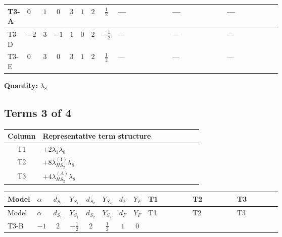 \documentclass[8pt]{article}
\begin{document}
\begin{landscape}
\begin{longtable}{@{}llcccccc >{\raggedright\arraybackslash}p{0.21\linewidth} >{\raggedright\arraybackslash}p{0.21\linewidth} >{\raggedright\arraybackslash}p{0.21\linewidth}@{}}
\midrule
T3-A & $0$ & $1$ & $0$ & $3$ & $1$ & $2$ & $\frac{1}{2}$ & --- & --- & --- \\
\midrule
T3-D & $-2$ & $3$ & $-1$ & $1$ & $0$ & $2$ & $-\frac{1}{2}$ & --- & --- & --- \\
\midrule
T3-E & $0$ & $3$ & $0$ & $3$ & $1$ & $2$ & $\frac{1}{2}$ & --- & --- & --- \\
\midrule
\bottomrule
\end{longtable}
\clearpage
\noindent\textbf{Quantity: }$\lambda_{8}$\par\smallskip
\subsection*{Terms 3 of 4}
\begin{center}
\begin{tabular}{@{}c >{\raggedright\arraybackslash}p{0.82\linewidth}@{}}
\toprule
Column & Representative term structure \\
\midrule
T1 & \(\displaystyle +2 {\lambda_1} {\lambda_8}\) \\
\midrule
T2 & \(\displaystyle +8 {\lambda_{HS_2}^{(1)}} {\lambda_8}\) \\
\midrule
T3 & \(\displaystyle +4 {\lambda_{HS_2}^{(A)}} {\lambda_8}\) \\
\midrule
\bottomrule
\end{tabular}
\end{center}
\smallskip
\tiny
\begin{longtable}{@{}llcccccc >{\raggedright\arraybackslash}p{0.21\linewidth} >{\raggedright\arraybackslash}p{0.21\linewidth} >{\raggedright\arraybackslash}p{0.21\linewidth}@{}}
\toprule
Model & $\alpha$ & $d_{S_1}$ & $Y_{S_1}$ & $d_{S_2}$ & $Y_{S_2}$ & $d_F$ & $Y_F$ & T1 & T2 & T3 \\
\midrule
\endfirsthead
\toprule
Model & $\alpha$ & $d_{S_1}$ & $Y_{S_1}$ & $d_{S_2}$ & $Y_{S_2}$ & $d_F$ & $Y_F$ & T1 & T2 & T3 \\
\midrule
\endhead
T3-B & $-1$ & $2$ & $-\frac{1}{2}$ & $2$ & $\frac{1}{2}$ & $1$ & $0$ & \scriptsize\adjustbox{max width=\linewidth}{$\begin{gathered} +2 {\lambda_1} {\lambda_8}\end{gathered}$} & \scriptsize\adjustbox{max width=\linewidth}{$\begin{gathered} +8 {\lambda_{HS_2}^{(1)}} {\lambda_8}\end{gathered}$} & \scriptsize\adjustbox{max width=\linewidth}{$\begin{gathered} +4 {\lambda_{HS_2}^{(A)}} {\lambda_8}\end{gathered}$} \\

\end{longtable}
\end{landscape}
\end{document}
